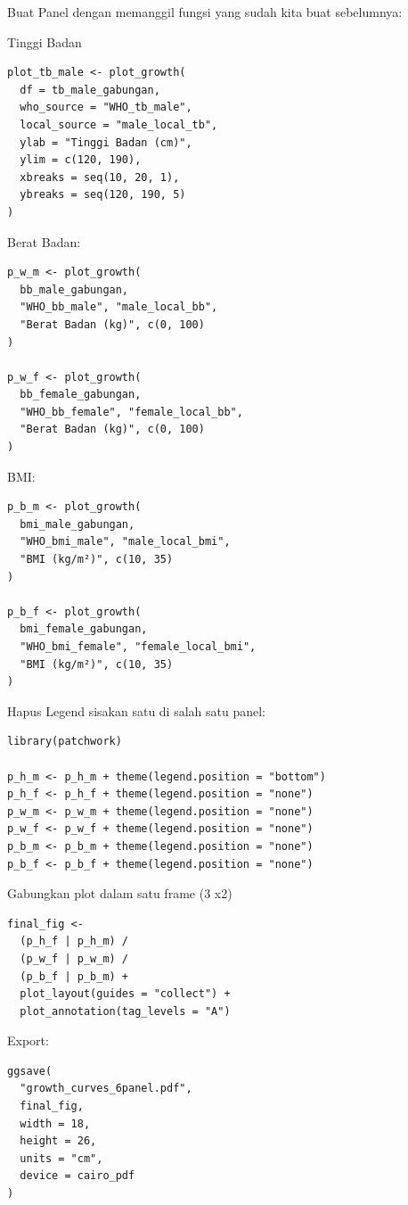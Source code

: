 \documentclass[11pt, a4paper]{article}
\begin{document}
Buat Panel dengan memanggil fungsi yang sudah kita buat sebelumnya:

Tinggi Badan
\begin{lstlisting}
plot_tb_male <- plot_growth(
  df = tb_male_gabungan,
  who_source = "WHO_tb_male",
  local_source = "male_local_tb",
  ylab = "Tinggi Badan (cm)",
  ylim = c(120, 190),
  xbreaks = seq(10, 20, 1),
  ybreaks = seq(120, 190, 5)
)
\end{lstlisting}

Berat Badan:
\begin{lstlisting}
p_w_m <- plot_growth(
  bb_male_gabungan,
  "WHO_bb_male", "male_local_bb",
  "Berat Badan (kg)", c(0, 100)
)

p_w_f <- plot_growth(
  bb_female_gabungan,
  "WHO_bb_female", "female_local_bb",
  "Berat Badan (kg)", c(0, 100)
)
\end{lstlisting}

BMI:
\begin{lstlisting}
p_b_m <- plot_growth(
  bmi_male_gabungan,
  "WHO_bmi_male", "male_local_bmi",
  "BMI (kg/m²)", c(10, 35)
)

p_b_f <- plot_growth(
  bmi_female_gabungan,
  "WHO_bmi_female", "female_local_bmi",
  "BMI (kg/m²)", c(10, 35)
)
\end{lstlisting}

Hapus Legend sisakan satu di salah satu panel:
\begin{lstlisting}
library(patchwork)

p_h_m <- p_h_m + theme(legend.position = "bottom")
p_h_f <- p_h_f + theme(legend.position = "none")
p_w_m <- p_w_m + theme(legend.position = "none")
p_w_f <- p_w_f + theme(legend.position = "none")
p_b_m <- p_b_m + theme(legend.position = "none")
p_b_f <- p_b_f + theme(legend.position = "none")
\end{lstlisting}

Gabungkan plot dalam satu frame (3 x2)
\begin{lstlisting}
final_fig <-
  (p_h_f | p_h_m) /
  (p_w_f | p_w_m) /
  (p_b_f | p_b_m) +
  plot_layout(guides = "collect") +
  plot_annotation(tag_levels = "A")
\end{lstlisting}

Export:
\begin{lstlisting}
ggsave(
  "growth_curves_6panel.pdf",
  final_fig,
  width = 18,
  height = 26,
  units = "cm",
  device = cairo_pdf
)
\end{lstlisting}
\begin{itemize}[label=$\square$]

\end{itemize}

\printbibliography
\end{document}
